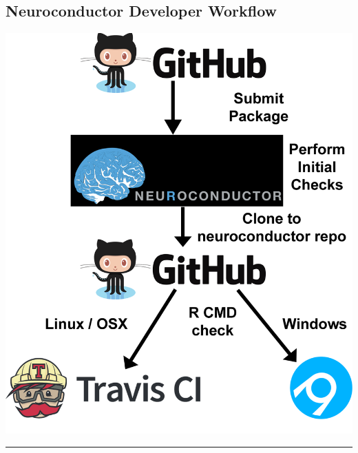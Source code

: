 \documentclass[final]{beamer}\usepackage[]{graphicx}\usepackage[]{color}
\begin{document}
\begin{frame}[fragile]
\begin{table}[!htb]
\begin{minipage}{0.36\linewidth}
\vspace*{-0.65cm}
\section{Neuroconductor Developer Workflow}

\begin{center}
\includegraphics[width=0.8\linewidth]{neuroc_workflow.png}
\end{center}

\noindent\rule{\linewidth}{5pt}




\end{minipage}
\end{table}
\end{frame}
\end{document}
